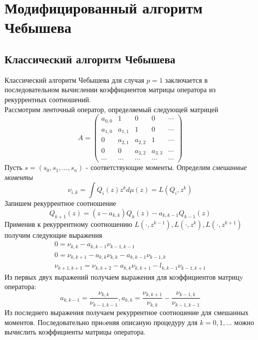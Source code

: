 \section{Модифицированный алгоритм Чебышева}
\subsection{Классический алгоритм Чебышева}
Классический алгоритм Чебышева для случая $p=1$ заключается в
последовательном вычислении коэффициентов матрицы оператора из
рекуррентных соотношений. \\
Рассмотрим ленточный оператор, определяемый следующей матрицей
$$
A=\left(
\begin{array}{ccccccccccccc}
a_{0,0} & 1 & 0 & 0 & \cdots \\
a_{1,0} & a_{1,1} & 1 & 0 & \cdots \\
0 & a_{2,1} & a_{2,2} & 1 & \cdots \\
0 & 0 & a_{3,2} & a_{3,3} & \cdots \\
\cdots & \cdots & \cdots & \cdots & \cdots
\end{array}
\right)
$$
Пусть $s=(s_0, s_1, \ldots, s_n)$ - соответствующие моменты.
Определим \emph{смешанные моменты}
$$
\nu_{i,k}=\int {Q_i(z)z^kd\mu(z)=L(Q_{i},z^k)}
$$
Запишем рекуррентное соотношение
$$
Q_{k+1}(z)=(z-a_{k,k})Q_k(z)-a_{k,k-1}Q_{k-1}(z)
$$
Применив к рекуррентному соотношению $L(\cdot, z^{k-1}), L(\cdot,
z^k), L(\cdot, z^{k+1}) $ получим следующие выражения
\begin{eqnarray}
0=\nu_{k,k}-a_{k,k-1}\nu_{k-1,k-1} \nonumber \\
0=\nu_{k,k+1}-a_{k,k}\nu_{k,k}-a_{k,k-1}\nu_{k-1,k} \nonumber \\
\nu_{k+1,k+1}=\nu_{k,k+2}-a_{k,k}\nu_{k,k+1}-l_{k,k-1}\nu_{k-1,k+1}
\nonumber
\end{eqnarray}
Из первых двух выражений получаем выражения для коэффициентов
матрицy оператора:
\begin{equation}
a_{k,k-1}=\frac{\nu_{k,k}}{\nu_{k-1,k-1}},
a_{k,k}=\frac{\nu_{k,k+1}}{\nu_{k,k}}-\frac{\nu_{k-1,k}}{\nu_{k-1,k-1}}
\end{equation}
Из последнего выражения получаем рекуррентное соотношение для
смешанных моментов. Последовательно приoеняя описаную процедуру
для $k=0,1, \ldots$ можно вычислить коэффициенты матрицы
оператора.
